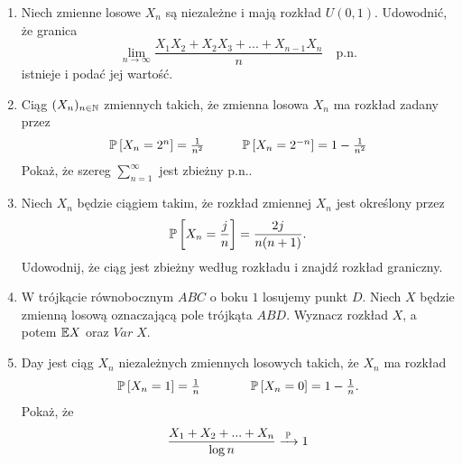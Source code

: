 \documentclass{article}
\begin{document}
\begin{enumerate}
  \item Niech zmienne losowe $X_n$ są niezależne i mają rozkład $U(0, 1)$. Udowodnić, że granica
    $$\lim_{n\to\infty}\frac{X_1X_2+X_2X_3+...+X_{n-1}X_n}{n}\quad \text{p.n.}$$
    istnieje i podać jej wartość.
  \item Ciąg $(X_n)_{n\in\mathbb{N}}$ zmiennych takich, że zmienna losowa $X_n$ ma rozkład zadany przez
    $$\begin{matrix}\prob{X_n=2^n}=\frac{1}{n^2}& & &\prob{X_n=2^{-n}}=1-\frac{1}{n^2}\end{matrix}$$
    Pokaż, że szereg $\sum\limits_{n=1}^\infty$ jest zbieżny p.n..
  \item Niech $X_n$ będzie ciągiem takim, że rozkład zmiennej $X_n$ jest określony przez
    $$\prob{X_n=\frac{j}{n}}=\frac{2j}{n(n+1)}.$$
    Udowodnij, że ciąg jest zbieżny według rozkładu i znajdź rozkład graniczny.
  \item W trójkącie równobocznym $ABC$ o boku $1$ losujemy punkt $D$. Niech $X$ będzie zmienną losową oznaczającą pole trójkąta $ABD$. Wyznacz rozkład $X$, a potem $\mathbb{E} X$ oraz $Var\; X$.
  \item Day jest ciąg $X_n$ niezależnych zmiennych losowych takich, że $X_n$ ma rozkład
    $$\begin{matrix}\prob{X_n=1}=\frac{1}{n}& & & &\prob{X_n=0}=1-\frac{1}{n}\end{matrix}.$$
    Pokaż, że
    $$\frac{X_1+X_2+...+X_n}{\log n}\xrightarrow[]{\;\prob\;}1$$
\end{enumerate}
\end{document}
